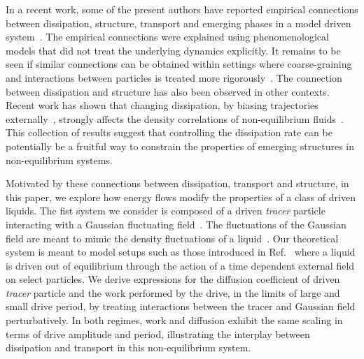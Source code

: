 \documentclass[pre, superscriptaddress, twocolumn,pre]{revtex4-1}
\begin{document}


In a recent work, some of the present authors have reported empirical connections between dissipation, structure, transport and emerging phases in a model driven system~\cite{Han2016, delJunco2018}. The empirical connections were explained using phenomenological models that did not treat the underlying dynamics explicitly. It remains to be seen if similar connections can be obtained within settings where coarse-graining and interactions between particles is treated more rigorously~\cite{Dean1996, Demery2011, Demery2014}. The connection between dissipation and structure has also been observed in other contexts. Recent work has shown that changing dissipation, by biasing trajectories externally~\cite{Lecomte2007, Touchette2009, Jack2010}, strongly affects the density correlations of non-equilibrium fluids~\cite{Nemoto2018a}. This collection of results suggest that controlling the dissipation rate can be potentially be a fruitful way to constrain the properties of emerging structures in non-equilibrium systems.


Motivated by these connections between dissipation, transport and structure, in this paper, we explore how energy flows modify the properties of a class of driven liquids. The fist system we consider is composed of a driven \textit{tracer} particle interacting with a Gaussian fluctuating field~\cite{Chandler1993, Dean1996, Demery2014, Kruger2017}. The fluctuations of the Gaussian field are meant to mimic the density fluctuations of a liquid~\cite{Chandler1993}. Our theoretical system is meant to model setups such as those introduced in Ref.~\cite{Han2016,delJunco2018} where a liquid is driven out of equilibrium through the action of a time dependent external field on select particles.  We derive expressions for the diffusion coefficient of driven \textit{tracer} particle and the work performed by the drive, in the limits of large and small drive period, by treating interactions between the tracer and Gaussian field perturbatively. In both regimes, work and diffusion exhibit the same scaling in terms of drive amplitude and period, illustrating the interplay between dissipation and transport in this non-equilibrium system. 
\end{document}
